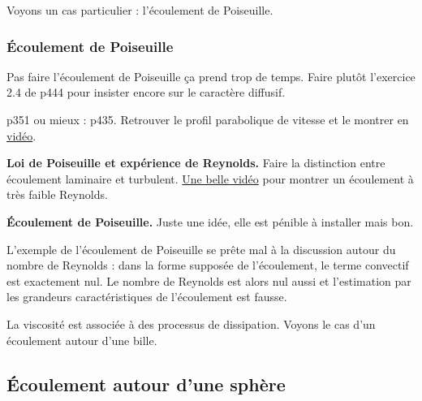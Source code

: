 \begin{transition}
Voyons un cas particulier : l'écoulement de Poiseuille.
\end{transition}

\subsubsection{Écoulement de Poiseuille}

\begin{remarque}
Pas faire l'écoulement de Poiseuille ça prend trop de temps.
Faire plutôt l'exercice 2.4 de \cite{Olivier2000} p444 pour insister encore sur le caractère diffusif.
\end{remarque}

\cite{Sanz2016} p351 ou mieux : \cite{Olivier2000} p435.
Retrouver le profil parabolique de vitesse et le montrer en \href{http://culturesciencesphysique.ens-lyon.fr/la-physique-animee/la-physique-animee-une-serie-de-videos-de-physique}{vidéo}.

\begin{slide}
\textbf{Loi de Poiseuille et expérience de Reynolds.}
Faire la distinction entre écoulement laminaire et turbulent.
\href{https://www.youtube.com/watch?v=k7ZZtxdtmeQ}{Une belle vidéo} pour montrer un écoulement à très faible Reynolds.
\end{slide}

\begin{experience}
\textbf{Écoulement de Poiseuille.}
Juste une idée, elle est pénible à installer mais bon.
\end{experience}

\begin{remarque}
L'exemple de l'écoulement de Poiseuille se prête mal à la discussion autour du nombre de Reynolds : dans la forme supposée de l'écoulement, le terme convectif est exactement nul.
Le nombre de Reynolds est alors nul aussi et l'estimation par les grandeurs caractéristiques de l'écoulement est fausse.
\end{remarque}

\begin{transition}
La viscosité est associée à des processus de dissipation.
Voyons le cas d'un écoulement autour d'une bille.
\end{transition}

\subsection{Écoulement autour d'une sphère}


